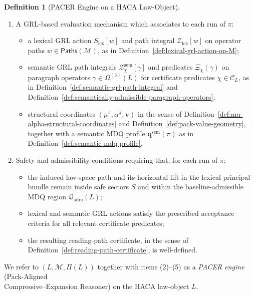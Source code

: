 \documentclass[11pt]{book}
\theoremstyle{plain}
\theoremstyle{definition}
\newtheorem{definition}[theorem]{Definition}
\theoremstyle{remark}
\begin{document}
\begin{definition}[PACER Engine on a HACA Law-Object]
\begin{enumerate}
        Definition~\ref{def:paragraph-monoid-morphism}, and
        $\gamma^{(\pi)}$ belongs to a homotopy class
        $[\gamma^{(\pi)}]$ as in
        Definition~\ref{def:pacer-reading-path-homotopy}.
  \item A GRL-based evaluation mechanism which associates to each run
        of $\pi$:
        \begin{itemize}
          \item a lexical GRL action $S_{\mathrm{lex}}[w]$ and path
                integral $\mathcal{Z}_{\mathrm{lex}}[w]$ on operator
                paths $w\in\mathsf{Paths}(\mathcal{M})$, as in
                Definition~\ref{def:lexical-grl-action-on-M};
          \item semantic GRL path integrals
                $\mathcal{Z}^{\mathrm{sem}}_\chi[\gamma]$ and predicates
                $\Xi_\chi(\gamma)$ on paragraph operators
                $\gamma\in\Omega^{(3)}(L)$ for certificate predicates
                $\chi\in\mathcal{C}_L$, as in
                Definition~\ref{def:semantic-grl-path-integral} and
                Definition~\ref{def:semantically-admissible-paragraph-operators};
          \item structural coordinates $(\mu^\pi,\alpha^\pi,\mathbf{v})$
                in the sense of
                Definition~\ref{def:mu-alpha-structural-coordinates}
                and Definition~\ref{def:pack-value-geometry},
                together with a semantic MDQ profile
                $\mathbf{q}^{\mathrm{sem}}(\pi)$ as in
                Definition~\ref{def:semantic-mdq-profile}.
        \end{itemize}
  \item Safety and admissibility conditions requiring that, for each
        run of $\pi$:
        \begin{itemize}
          \item the induced law-space path and its horizontal lift in
                the lexical principal bundle remain inside safe sectors
                $S$ and within the baseline-admissible MDQ region
                $\mathcal{Q}_{\mathrm{adm}}(L)$;
          \item lexical and semantic GRL actions satisfy the prescribed
                acceptance criteria for all relevant certificate
                predicates;
          \item the resulting reading-path certificate, in the sense of
                Definition~\ref{def:reading-path-certificate}, is
                well-defined.
        \end{itemize}
\end{enumerate}
We refer to $(L,\mathcal{M},\Pi(L))$ together with items (2)–(5) as a
\emph{PACER engine} (Pack-Aligned \\Compressive–Expansion Reasoner) on
the HACA law-object $L$.
\end{definition}
\end{document}
